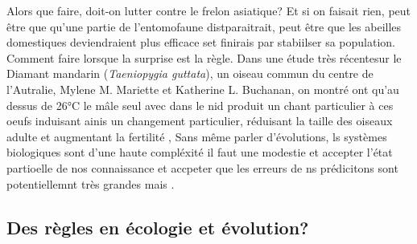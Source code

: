 Alors que faire, doit-on lutter contre le frelon asiatique? Et si on
faisait rien, peut être que qu'une partie de l'entomofaune
distparaitrait, peut être que les abeilles domestiques deviendraient
plus efficace set finirais par stabiilser sa population. Comment faire
lorsque la surprise est la règle. Dans une étude très récentesur le
Diamant mandarin (\emph{Taeniopygia guttata}), un oiseau commun du
centre de l'Autralie, Mylene M. Mariette et Katherine L. Buchanan, on
montré ont qu'au dessus de 26°C le mâle seul avec dans le nid produit un
chant particulier à ces oeufs induisant ainis un changement particulier,
réduisant la taille des oiseaux adulte et augmentant la fertilité
\citep{Mariette2016}, Sans même parler d'évolutions, ls systèmes
biologiques sont d'une haute compléxité il faut une modestie et accepter
l'état partioelle de nos connaissance et accpeter que les erreurs de ns
prédicitons sont potentiellemnt très grandes mais \citep{Mouquet2015}.

\subsection*{Des règles en écologie et
évolution?}\label{des-ruxe8gles-en-uxe9cologie-et-uxe9volution}

